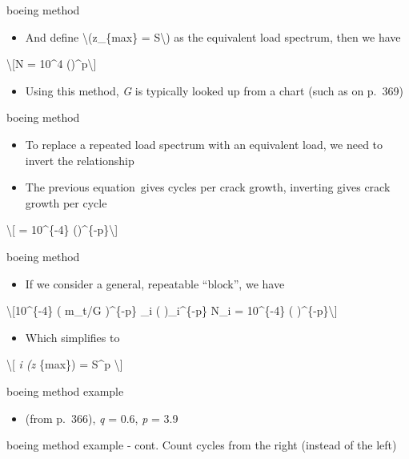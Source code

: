 \documentclass[
  letterpaper,
  ignorenonframetext,
  aspectratio=43,
  handout,
  12pt]{beamer}
\providecommand{\tightlist}{%
  \setlength{\itemsep}{0pt}\setlength{\parskip}{0pt}}
\providecommand{\tightlist}{%
\setlength{\itemsep}{0pt}\setlength{\parskip}{0pt}}
\begin{document}
\begin{frame}{boeing method}
\protect\hypertarget{boeing-method-6}{}
\begin{itemize}
\tightlist
\item
  And define \textbackslash(z\sigma\_\{max\} = S\textbackslash) as the
  equivalent load spectrum, then we have
\end{itemize}

\textbackslash{[}N = 10\^{}4
\left(\right)\^{}p\textbackslash{]}

\begin{itemize}
\tightlist
\item
  Using this method, \emph{G} is typically looked up from a chart (such
  as on p.~369)
\end{itemize}
\end{frame}

\begin{frame}{boeing method}
\protect\hypertarget{boeing-method-7}{}
\begin{itemize}
\tightlist
\item
  To replace a repeated load spectrum with an equivalent load, we need
  to invert the relationship
\item
  The previous equation~gives cycles per crack growth, inverting gives
  crack growth per cycle
\end{itemize}

\textbackslash{[} = 10\^{}\{-4\}
\left(\right)\^{}\{-p\}\textbackslash{]}
\end{frame}

\begin{frame}{boeing method}
\protect\hypertarget{boeing-method-8}{}
\begin{itemize}
\tightlist
\item
  If we consider a general, repeatable ``block'', we have
\end{itemize}

\textbackslash{[}10\^{}\{-4\} \left( m\_t/G \right)\^{}\{-p\} \sum\_i
\left(  \right)\_i\^{}\{-p\} N\_i = 10\^{}\{-4\}
\left(  \right)\^{}\{-p\}\textbackslash{]}

\begin{itemize}
\tightlist
\item
  Which simplifies to
\end{itemize}

\textbackslash{[} \sum\emph{i (z \sigma}\{max\}) = S\^{}p
\textbackslash{]}
\end{frame}

\begin{frame}{boeing method example}
\protect\hypertarget{boeing-method-example}{}
\begin{itemize}
\tightlist
\item
  (from p.~366), \emph{q} = 0.6, \emph{p} = 3.9
\end{itemize}
\end{frame}

\begin{frame}{boeing method example - cont.}
\protect\hypertarget{boeing-method-example---cont.}{}
Count cycles from the right (instead of the left)
\end{frame}
\end{document}
